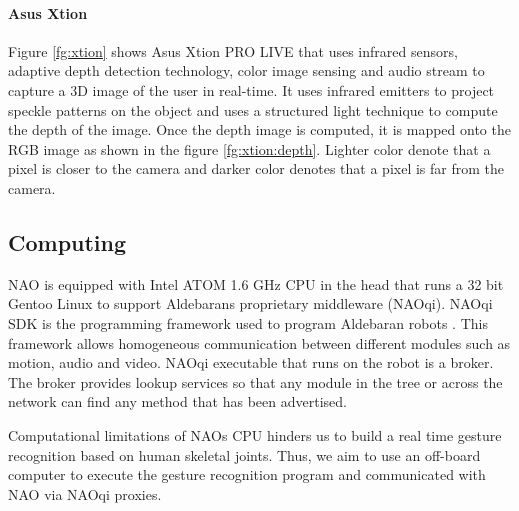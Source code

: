 

\paragraph*{Asus Xtion} Figure \ref{fg:xtion} shows Asus Xtion PRO LIVE that uses infrared sensors, adaptive depth detection technology, color image sensing and audio stream to capture a 3D image of the user in real-time. It uses infrared emitters to project speckle patterns on the object and uses a structured light technique to compute the depth of the image. Once the depth image is computed, it is mapped onto the RGB image as shown in the figure \ref{fg:xtion:depth}. Lighter color denote that a pixel is closer to the camera and darker color denotes that a pixel is far from the camera.



\subsection{Computing} NAO is equipped with Intel ATOM 1.6 GHz CPU in the head that runs a 32 bit Gentoo Linux to support Aldebarans proprietary middleware (NAOqi). NAOqi SDK is the programming framework used to program Aldebaran robots \cite{8}. This framework allows homogeneous communication between different modules such as motion, audio and video. NAOqi executable that runs on the robot is a broker. The broker provides lookup services so that any module in the tree or across the network can find any method that has been advertised.



Computational limitations of NAOs CPU hinders us to build a real time gesture recognition based on human skeletal joints. Thus, we aim to use an off-board computer to execute the gesture recognition program and communicated with NAO via NAOqi proxies. 
